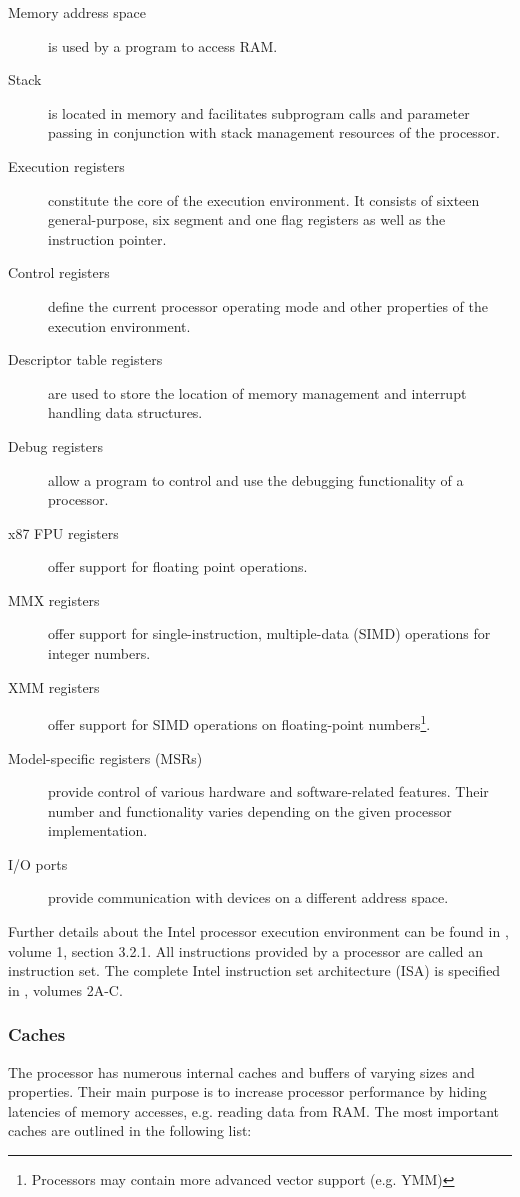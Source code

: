\begin{description}
	\item[Memory address space] is used by a program to access RAM.
	\item[Stack] is located in memory and facilitates subprogram calls and
		parameter passing in conjunction with stack management resources of the
		processor.
	\item[Execution registers] constitute the core of the execution environment.
		It consists of sixteen general-purpose, six segment and one flag
		registers as well as the instruction pointer.
	\item[Control registers] define the current processor operating mode and
		other properties of the execution environment.
	\item[Descriptor table registers] are used to store the location of memory
		management and interrupt handling data structures.
	\item[Debug registers] allow a program to control and use the debugging
		functionality of a processor.
	\item[x87 FPU registers] offer support for floating point operations.
	\item[MMX registers] offer support for single-instruction, multiple-data
		(SIMD) operations for integer numbers.
	\item[XMM registers] offer support for SIMD operations on floating-point
		numbers\footnote{Processors may contain more advanced vector support
		(e.g. YMM)}.
	\item[Model-specific registers (MSRs)] provide control of various hardware
		and software-related features. Their number and functionality varies
		depending on the given processor implementation.
	\item[I/O ports] provide communication with devices on a different address
		space.
\end{description}

Further details about the Intel processor execution environment can be found in
\cite{IntelSDM}, volume 1, section 3.2.1. All instructions provided by a
processor are called an instruction set. The complete Intel instruction set
architecture (ISA) is specified in \cite{IntelSDM}, volumes 2A-C.

\subsubsection{Caches}
The processor has numerous internal caches and buffers of varying sizes and
properties. Their main purpose is to increase processor performance by
hiding latencies of memory accesses, e.g. reading data from RAM. The most
important caches are outlined in the following list:

